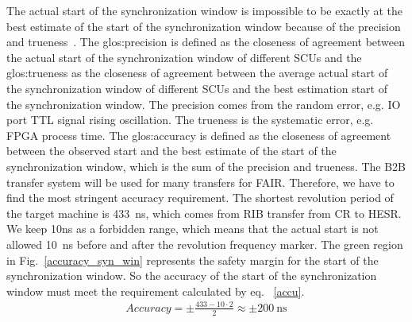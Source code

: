 The actual start of the synchronization window is impossible to be exactly at the best estimate of the start of the synchronization window because of the precision and trueness~\cite{_statistical_????}. The \gls{glos:precision} is defined as the closeness of agreement between the actual start of the synchronization window of different SCUs and the \gls{glos:trueness} as the closeness of agreement between the average actual start of the synchronization window of different SCUs and the best estimation start of the synchronization window. The precision comes from the random error, e.g. IO port \gls{TTL} signal rising oscillation. The trueness is the systematic error, e.g. FPGA process time. The \gls{glos:accuracy} is defined as the closeness of agreement between the observed start and the best estimate of the start of the synchronization window, which is the sum of the precision and trueness. The B2B transfer system will be used for many transfers for FAIR. Therefore, we have to find the most stringent accuracy requirement. The shortest revolution period of the target machine is \SI{433}{\ns}, which comes from RIB transfer from CR to HESR. We keep 10ns as a forbidden range, which means that the actual start is not allowed \SI{10}{\ns} before and after the revolution frequency marker. The green region in Fig.~\ref{accuracy_syn_win} represents the safety margin for the start of the synchronization window. So the accuracy of the start of the synchronization window must meet the requirement calculated by eq. ~\ref{accu}.
\begin{equation}
\begin{aligned}
Accuracy=\pm\frac{433-10 \cdot 2}{2}\approx \pm \SI{200}{\ns}\label{accu}
\end{aligned}
\end{equation}


